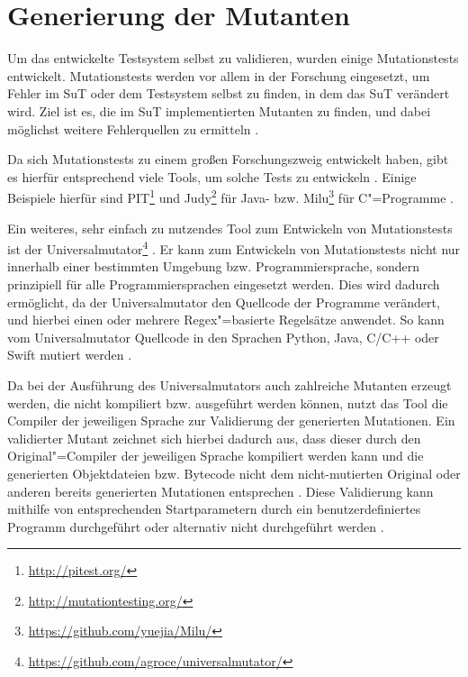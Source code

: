\section{Generierung der Mutanten}
\label{sec:implMutationTests}

Um das entwickelte Testsystem selbst zu validieren, wurden einige Mutationstests entwickelt.
Mutationstests werden vor allem in der Forschung eingesetzt, um Fehler im \gls{SuT} oder dem Testsystem selbst zu finden, in dem das \gls{SuT} verändert wird.
Ziel ist es, die im \gls{SuT} implementierten Mutanten zu finden, und dabei möglichst weitere Fehlerquellen zu ermitteln \cite{DeMillo1978,Hamlet1977,Jia2011,Groce2018}.

Da sich Mutationstests zu einem großen Forschungszweig entwickelt haben, gibt es hierfür entsprechend viele Tools, um solche Tests zu entwickeln \cite{Jia2011,Groce2018}.
Einige Beispiele hierfür sind PIT\footnote{\url{http://pitest.org/}} und Judy\footnote{\url{http://mutationtesting.org/}} für Java- bzw. Milu\footnote{\url{https://github.com/yuejia/Milu/}} für C"=Programme \cite{Coles2016,Madeyski2010,Jia2008}.

Ein weiteres, sehr einfach zu nutzendes Tool zum Entwickeln von Mutationstests ist der Universalmutator\footnote{\url{https://github.com/agroce/universalmutator/}} \cite{Groce2018}.
Er kann zum Entwickeln von Mutationstests nicht nur innerhalb einer bestimmten Umgebung bzw. Programmiersprache, sondern prinzipiell für alle Programmiersprachen eingesetzt werden.
Dies wird dadurch ermöglicht, da der Universalmutator den Quellcode der Programme verändert, und hierbei einen oder mehrere \gls{Regex}"=basierte Regelsätze anwendet.
So kann vom Universalmutator Quellcode \uA in den Sprachen Python, Java, C/C++ oder Swift mutiert werden \cite{Groce2018}.

Da bei der Ausführung des Universalmutators auch zahlreiche Mutanten erzeugt werden, die nicht kompiliert bzw. ausgeführt werden können, nutzt das Tool die Compiler der jeweiligen Sprache zur Validierung der generierten Mutationen.
Ein validierter Mutant zeichnet sich hierbei dadurch aus, dass dieser durch den Original"=Compiler der jeweiligen Sprache kompiliert werden kann und die generierten Objektdateien bzw. Bytecode nicht dem nicht-mutierten Original oder anderen bereits generierten Mutationen entsprechen \cite{Groce2018}.
Diese Validierung kann mithilfe von entsprechenden Startparametern durch ein benutzerdefiniertes Programm durchgeführt oder alternativ nicht durchgeführt werden \cite{Groce2018,UniversalmutatorSourceGenmutants}.


